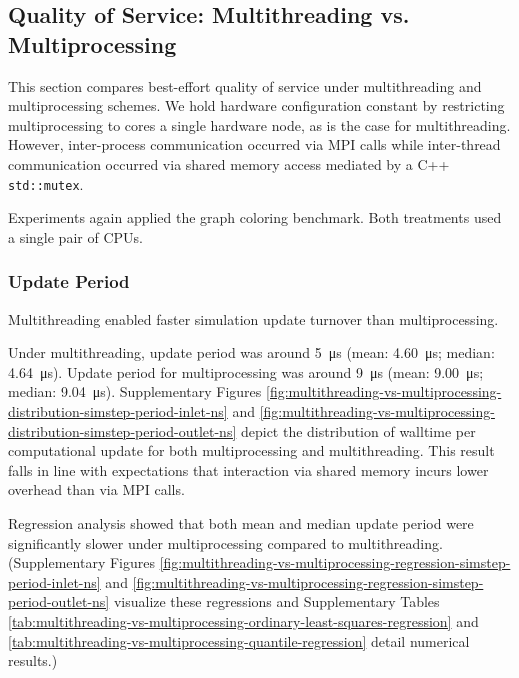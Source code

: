\subsection{Quality of Service: Multithreading vs. Multiprocessing}
\label{sec:multithreading-vs-multiprocessing}

This section compares best-effort quality of service under multithreading and multiprocessing schemes.
We hold hardware configuration constant by restricting multiprocessing to cores a single hardware node, as is the case for multithreading.
However, inter-process communication occurred via MPI calls while inter-thread communication occurred via shared memory access mediated by a C++ \texttt{std::mutex}.

Experiments again applied the graph coloring benchmark.
Both treatments used a single pair of CPUs.

\subsubsection{Update Period}

Multithreading enabled faster simulation update turnover than multiprocessing.

Under multithreading, update period was around \SI{5}{\micro\second} (mean: \SI{4.60}{\micro\second}; median: \SI{4.64}{\micro\second}).
Update period for multiprocessing was around \SI{9}{\micro\second} (mean: \SI{9.00}{\micro\second}; median: \SI{9.04}{\micro\second}).
Supplementary Figures \ref{fig:multithreading-vs-multiprocessing-distribution-simstep-period-inlet-ns} and \ref{fig:multithreading-vs-multiprocessing-distribution-simstep-period-outlet-ns} depict the distribution of walltime per computational update for both multiprocessing and multithreading.
This result falls in line with expectations that interaction via shared memory incurs lower overhead than via MPI calls.

Regression analysis showed that both mean and median update period were significantly slower under multiprocessing compared to multithreading.
(Supplementary Figures \ref{fig:multithreading-vs-multiprocessing-regression-simstep-period-inlet-ns} and \ref{fig:multithreading-vs-multiprocessing-regression-simstep-period-outlet-ns} visualize these regressions and Supplementary Tables \ref{tab:multithreading-vs-multiprocessing-ordinary-least-squares-regression} and \ref{tab:multithreading-vs-multiprocessing-quantile-regression} detail numerical results.)

